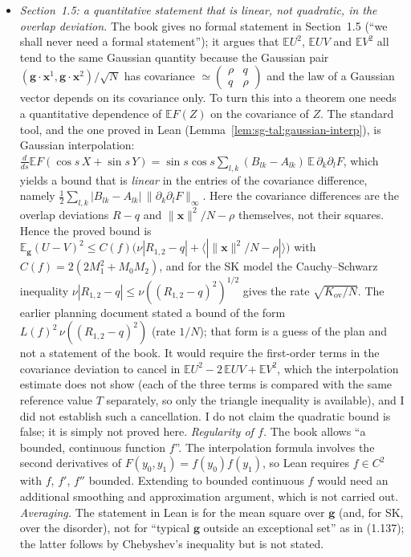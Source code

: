 \begin{remark}
\begin{itemize}
\item \emph{Section~1.5: a quantitative statement that is linear, not quadratic, in the overlap deviation.}
The book gives no formal statement in Section~1.5 (``we shall never need a formal statement''); it argues that $\mathbb{E}U^2$, $\mathbb{E}UV$ and $\mathbb{E}V^2$ all tend to the same Gaussian quantity because the Gaussian pair $(\mathbf g\cdot\mathbf x^1,\mathbf g\cdot\mathbf x^2)/\sqrt N$ has covariance $\simeq\left(\begin{smallmatrix}\rho&q\\q&\rho\end{smallmatrix}\right)$ and the law of a Gaussian vector depends on its covariance only. To turn this into a theorem one needs a quantitative dependence of $\mathbb{E}F(Z)$ on the covariance of $Z$. The standard tool, and the one proved in Lean (Lemma~\ref{lem:sg-tal:gaussian-interp}), is Gaussian interpolation: $\frac{d}{ds}\mathbb{E}F(\cos s\,X+\sin s\,Y)=\sin s\cos s\sum_{l,k}(B_{lk}-A_{lk})\,\mathbb{E}\,\partial_k\partial_lF$, which yields a bound that is \emph{linear} in the entries of the covariance difference, namely $\tfrac12\sum_{l,k}|B_{lk}-A_{lk}|\,\|\partial_k\partial_lF\|_\infty$. Here the covariance differences are the overlap deviations $R-q$ and $\|\mathbf x\|^2/N-\rho$ themselves, not their squares. Hence the proved bound is $\mathbb{E}_{\mathbf g}(U-V)^2\le C(f)\big(\nu|R_{1,2}-q|+\langle|\|\mathbf x\|^2/N-\rho|\rangle\big)$ with $C(f)=2(2M_1^2+M_0M_2)$, and for the SK model the Cauchy--Schwarz inequality $\nu|R_{1,2}-q|\le\nu((R_{1,2}-q)^2)^{1/2}$ gives the rate $\sqrt{K_{\mathrm{ov}}/N}$. The earlier planning document stated a bound of the form $L(f)^2\,\nu((R_{1,2}-q)^2)$ (rate $1/N$); that form is a guess of the plan and not a statement of the book. It would require the first-order terms in the covariance deviation to cancel in $\mathbb{E}U^2-2\,\mathbb{E}UV+\mathbb{E}V^2$, which the interpolation estimate does not show (each of the three terms is compared with the same reference value $T$ separately, so only the triangle inequality is available), and I did not establish such a cancellation. I do not claim the quadratic bound is false; it is simply not proved here.
\emph{Regularity of $f$.} The book allows ``a bounded, continuous function $f$''. The interpolation formula involves the second derivatives of $F(y_0,y_1)=f(y_0)f(y_1)$, so Lean requires $f\in C^2$ with $f$, $f'$, $f''$ bounded. Extending to bounded continuous $f$ would need an additional smoothing and approximation argument, which is not carried out.
\emph{Averaging.} The statement in Lean is for the mean square over $\mathbf g$ (and, for SK, over the disorder), not for ``typical $\mathbf g$ outside an exceptional set'' as in (1.137); the latter follows by Chebyshev's inequality but is not stated.


\end{itemize}
\end{remark}

